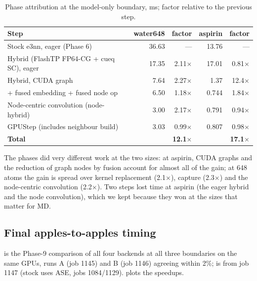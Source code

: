 \begin{table}[h]
\centering
\caption{Phase attribution at the model-only boundary, ms; factor relative to the previous step.}
\label{tab:ladder}
\small
\begin{tabular}{lrrrr}
\toprule
Step & water648 & factor & aspirin & factor \\
\midrule
Stock e3nn, eager (Phase 6) & 36.63 & --- & 13.76 & --- \\
Hybrid (FlashTP FP64-CG + cueq SC), eager & 17.35 & 2.11$\times$ & 17.01 & \textcolor{cbad}{0.81$\times$} \\
Hybrid, CUDA graph & 7.64 & 2.27$\times$ & 1.37 & 12.4$\times$ \\
+ fused embedding + fused node op & 6.50 & 1.18$\times$ & 0.744 & 1.84$\times$ \\
Node-centric convolution (node-hybrid) & 3.00 & 2.17$\times$ & 0.791 & \textcolor{cbad}{0.94$\times$} \\
GPUStep \Bone{} (includes neighbour build) & 3.03 & 0.99$\times$ & 0.807 & 0.98$\times$ \\
\midrule
\textbf{Total} & & \textbf{12.1$\times$} & & \textbf{17.1$\times$} \\
\bottomrule
\end{tabular}
\end{table}

The phases did very different work at the two sizes: at aspirin, CUDA graphs and the reduction of graph nodes by fusion account for almost all of the gain; at 648 atoms the gain is spread over kernel replacement (2.1$\times$), capture (2.3$\times$) and the node-centric convolution (2.2$\times$). Two steps lost time at aspirin (the eager hybrid and the node convolution), which we kept because they won at the sizes that matter for MD.

\subsection{Final apples-to-apples timing}
 is the Phase-9 comparison of all four backends at all three boundaries on the same GPUs, runs A (job 1145) and B (job 1146) agreeing within 2\%; \Bthree{} is from job 1147 (stock \Bthree{} uses ASE, jobs 1084/1129).  plots the \Btwo{} speedups.

